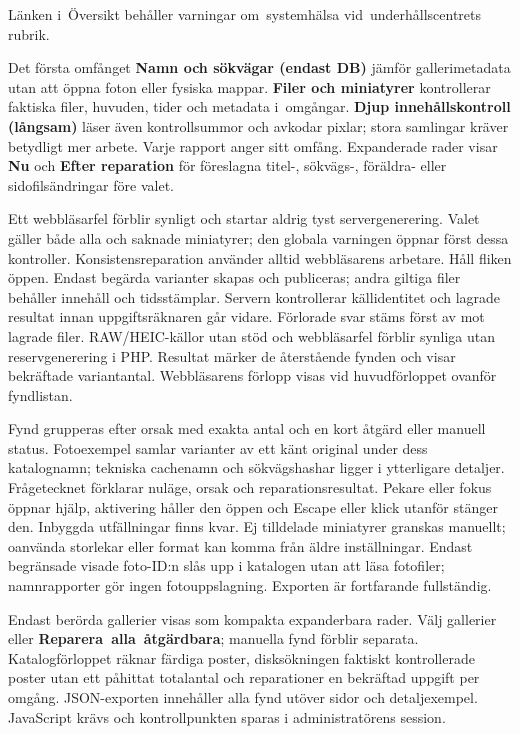 \documentclass[11pt,a4paper]{article}
\newcommand{\ui}[1]{\textbf{#1}}
\begin{document}
Länken i~Översikt behåller varningar om~systemhälsa vid~underhållscentrets
rubrik.

Det första omfånget \ui{Namn och sökvägar (endast DB)} jämför gallerimetadata
utan att öppna foton eller fysiska mappar. \ui{Filer och miniatyrer}
kontrollerar faktiska filer, huvuden, tider och metadata i~omgångar. \ui{Djup
innehållskontroll (långsam)} läser även kontrollsummor och avkodar pixlar;
stora samlingar kräver betydligt mer arbete. Varje rapport anger sitt omfång.
Expanderade rader visar \ui{Nu} och \ui{Efter reparation} för föreslagna
titel-, sökvägs-, föräldra- eller sidofilsändringar före valet.

Ett webbläsarfel förblir synligt och startar aldrig tyst servergenerering.
Valet gäller både alla och saknade miniatyrer; den globala varningen öppnar
först dessa kontroller. Konsistensreparation använder alltid webbläsarens
arbetare. Håll fliken öppen. Endast begärda varianter skapas och publiceras;
andra giltiga filer behåller innehåll och tidsstämplar. Servern kontrollerar
källidentitet och lagrade resultat innan uppgiftsräknaren går vidare.
Förlorade svar stäms först av mot lagrade filer. RAW/HEIC-källor utan stöd och
webbläsarfel förblir synliga utan reservgenerering i PHP. Resultat märker de
återstående fynden och visar bekräftade variantantal.
Webbläsarens förlopp visas vid huvudförloppet ovanför fyndlistan.

Fynd grupperas efter orsak med exakta antal och en kort åtgärd eller manuell
status. Fotoexempel samlar varianter av ett känt original under dess katalognamn;
tekniska cachenamn och sökvägshashar ligger i ytterligare detaljer. Frågetecknet
förklarar nuläge, orsak och reparationsresultat. Pekare eller fokus öppnar hjälp,
aktivering håller den öppen och Escape eller klick utanför stänger den.
Inbyggda utfällningar finns kvar. Ej tilldelade miniatyrer granskas manuellt;
oanvända storlekar eller format kan komma från äldre inställningar. Endast
begränsade visade foto-ID:n slås upp i katalogen utan att läsa fotofiler;
namnrapporter gör ingen fotouppslagning. Exporten är fortfarande fullständig.

Endast berörda gallerier visas som kompakta expanderbara rader. Välj gallerier
eller \ui{Reparera~alla~åtgärdbara}; manuella fynd förblir separata.
Katalogförloppet räknar färdiga poster, disksökningen faktiskt kontrollerade
poster utan ett påhittat totalantal och reparationer en bekräftad uppgift per
omgång. JSON-exporten innehåller alla fynd utöver sidor och detaljexempel.
JavaScript krävs och kontrollpunkten sparas i administratörens session.
\end{document}
